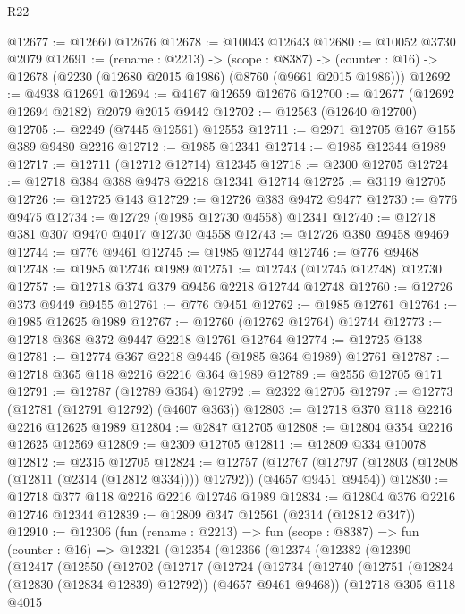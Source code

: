 \begin{lexlean}{R22}
\begin{coremodule}
@12677 := @12660 @12676
@12678 := @10043 @12643
@12680 := @10052 @3730 @2079
@12691 := (rename : @2213) ->
  (scope : @8387) ->
  (counter : @16) -> @12678 (@2230 (@12680 @2015 @1986) (@8760 (@9661 @2015 @1986)))
@12692 := @4938 @12691
@12694 := @4167 @12659 @12676
@12700 := @12677 (@12692 @12694 @2182) @2079 @2015 @9442
@12702 := @12563 (@12640 @12700)
@12705 := @2249 (@7445 @12561) @12553
@12711 := @2971 @12705 @167 @155 @389 @9480 @2216
@12712 := @1985 @12341
@12714 := @1985 @12344 @1989
@12717 := @12711 (@12712 @12714) @12345
@12718 := @2300 @12705
@12724 := @12718 @384 @388 @9478 @2218 @12341 @12714
@12725 := @3119 @12705
@12726 := @12725 @143
@12729 := @12726 @383 @9472 @9477
@12730 := @776 @9475
@12734 := @12729 (@1985 @12730 @4558) @12341
@12740 := @12718 @381 @307 @9470 @4017 @12730 @4558
@12743 := @12726 @380 @9458 @9469
@12744 := @776 @9461
@12745 := @1985 @12744
@12746 := @776 @9468
@12748 := @1985 @12746 @1989
@12751 := @12743 (@12745 @12748) @12730
@12757 := @12718 @374 @379 @9456 @2218 @12744 @12748
@12760 := @12726 @373 @9449 @9455
@12761 := @776 @9451
@12762 := @1985 @12761
@12764 := @1985 @12625 @1989
@12767 := @12760 (@12762 @12764) @12744
@12773 := @12718 @368 @372 @9447 @2218 @12761 @12764
@12774 := @12725 @138
@12781 := @12774 @367 @2218 @9446 (@1985 @364 @1989) @12761
@12787 := @12718 @365 @118 @2216 @2216 @364 @1989
@12789 := @2556 @12705 @171
@12791 := @12787 (@12789 @364)
@12792 := @2322 @12705
@12797 := @12773 (@12781 (@12791 @12792) (@4607 @363))
@12803 := @12718 @370 @118 @2216 @2216 @12625 @1989
@12804 := @2847 @12705
@12808 := @12804 @354 @2216 @12625 @12569
@12809 := @2309 @12705
@12811 := @12809 @334 @10078
@12812 := @2315 @12705
@12824 := @12757
    (@12767 (@12797 (@12803 (@12808 (@12811 (@2314 (@12812 @334)))) @12792)) (@4657 @9451 @9454))
@12830 := @12718 @377 @118 @2216 @2216 @12746 @1989
@12834 := @12804 @376 @2216 @12746 @12344
@12839 := @12809 @347 @12561 (@2314 (@12812 @347))
@12910 := @12306
    (fun (rename : @2213) =>
    fun (scope : @8387) =>
    fun (counter : @16) =>
    @12321
      (@12354
        (@12366
          (@12374
            (@12382
              (@12390
                (@12417
                  (@12550
                    (@12702
                      (@12717
                        (@12724
                          (@12734
                            (@12740
                              (@12751 (@12824 (@12830 (@12834 @12839) @12792)) (@4657 @9461 @9468))
                              (@12718
                                @305
                                @118
                                @4015

\end{coremodule}
\end{lexlean}
